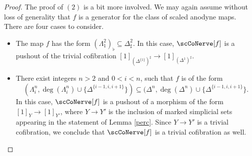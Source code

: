 \begin{proof}
The proof of $(2)$ is a bit more involved. We may again assume without loss of generality that
$f$ is a generator for the class of scaled anodyne maps. There are four cases to consider.
\begin{itemize}
\item[$(A)$] The map $f$ has the form $(\Lambda^2_1)_{\flat} \subseteq \Delta^2_{\sharp}$. In
this case, $\scCoNerve[f]$ is a pushout of the trivial cofibration
$[1]_{ (\Delta^{\{1\}})^{\sharp} } \rightarrow [1]_{ (\Delta^1)^{\sharp} }$.

\item[$(A')$] There exist integers $n > 2$ and $0 < i < n$, such that
$f$ is of the form 
$$( \Lambda^n_i, \deg( \Lambda^n_{i}) \cup \{ \Delta^{ \{i-1, i, i+1 \}} \}
) \subseteq ( \Delta^n, \deg( \Delta^n) \cup \{ \Delta^{ \{i-1, i, i+1 \} } \}.$$
In this case, $\scCoNerve[f]$ is a pushout of a morphism of the form
$[1]_{Y} \rightarrow [1]_{Y'}$, where $Y \rightarrow Y'$ is the inclusion of
marked simplicial sets appearing in the statement of Lemma \ref{perc}.
Since $Y \rightarrow Y'$ is a trivial cofibration, we conclude that
$\scCoNerve[f]$ is a trivial cofibration as well.



\end{itemize}
\end{proof}
